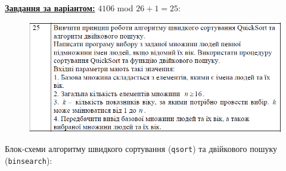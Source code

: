 \documentclass[12pt,a4paper]{article}
\begin{document}
    \textbf{\underline{Завдання за варіантом:}} $4106$ mod $26 + 1 = 25$:

    \begin{figure}[ht]
        \includegraphics[width=1.0\textwidth]{photo1.png}
    \end{figure}

    \setlength{\parindent}{0pt}

    Блок-схеми алгоритму швидкого сортування (\texttt{qsort}) та двійкового пошуку (\texttt{binsearch}):
\end{document}
